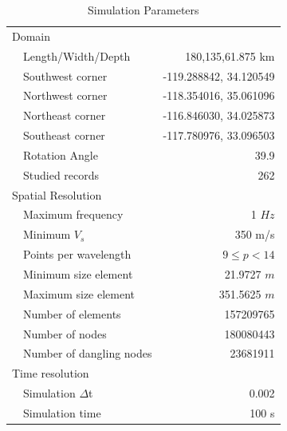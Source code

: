 \begin{table}[ht]
\centering
\caption{Simulation Parameters}
\label{tab:sim_param}
\renewcommand{\arraystretch}{0.75}
\begin{tabular}{lr}
\\ \hline
Domain                              &                              \\
~~Length/Width/Depth       & 180,135,61.875 km \\
~~Southwest corner          & -119.288842, 34.120549             \\
~~Northwest corner           & -118.354016, 35.061096             \\
~~Northeast corner            & -116.846030, 34.025873              \\
~~Southeast corner           & -117.780976, 33.096503               \\
~~Rotation Angle               & 39.9 \\
~~Studied records             & 262 \\
Spatial Resolution              &    \\
~~Maximum frequency     & 1 $Hz$ \\
~~Minimum $V_s$            & 350 m/s \\
~~Points per wavelength   & $9\leq p < 14$\\
~~Minimum size element   & 21.9727 $m$\\
~~Maximum size element   & 351.5625 $m$\\
~~Number of elements       & 157209765 \\
~~Number of nodes            & 180080443 \\
~~Number of dangling nodes & 23681911 \\
Time resolution  & \\
~~Simulation $\Delta$t & 0.002 \\
~~Simulation time & 100 s\\ \hline
\end{tabular}
\end{table}



